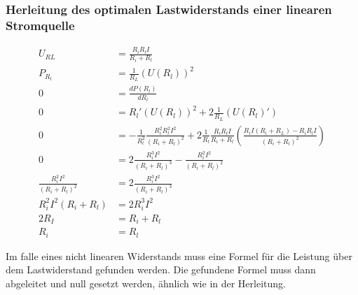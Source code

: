 \subsubsection{Herleitung des optimalen Lastwiderstands einer linearen Stromquelle}

\begin{center}
    
\end{center}

\begin{align*}
    U_{RL} & = \frac{R_i R_l I}{R_i + R_l}\\
    P_{R_l} & = \frac{1}{R_L}(U(R_l))^2\\
    0 & = \frac{d P(R_l)}{d R_l}\\
    0 & = R_l' (U(R_l))^2 + 2\frac{1}{R_L}(U(R_l)')\\
    0 & = -\frac{1}{R_l^2}\frac{R_i^2 R_l^2 I^2}{(R_i + R_l)^2 } + 2\frac{1}{R_l} \frac{R_i R_l I}{R_i + R_l}\left(\frac{R_i I(R_i + R_L)- R_i R_lI}{(R_i + R_l)^2}\right)\\
    0 & = 2 \frac{R_i^3 I^2}{(R_i + R_l)^3} - \frac{R_i^2  I^2}{(R_i + R_l)^2 }\\
    \frac{R_i^2  I^2}{(R_i + R_l)^2 } & = 2 \frac{R_i^3 I^2}{(R_i + R_l)^3}\\
    R_i^2 I^2 (R_i + R_l) & = 2 R_i^3 I^2\\
    2R_I & = R_i + R_l\\
    R_i &= R_l
\end{align*}

Im falle eines nicht linearen Widerstands muss eine Formel für die Leistung über dem Lastwiderstand gefunden werden. 
Die gefundene Formel muss dann abgeleitet und null gesetzt werden, ähnlich wie in der Herleitung.
